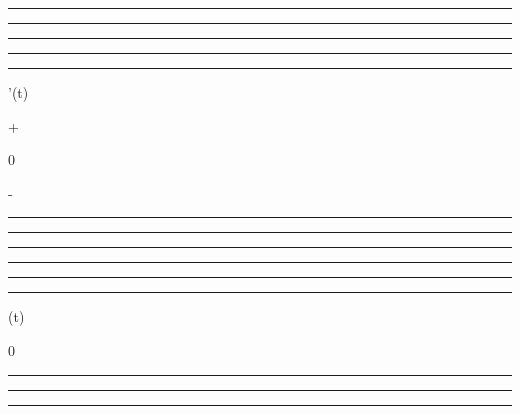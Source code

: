 \begin{center}\rule{3in}{0.4pt}\end{center}

\begin{center}\rule{3in}{0.4pt}\end{center}

\begin{center}\rule{3in}{0.4pt}\end{center}

\begin{center}\rule{3in}{0.4pt}\end{center}

\begin{center}\rule{3in}{0.4pt}\end{center}

\phi'(t)

+

0

-

\begin{center}\rule{3in}{0.4pt}\end{center}

\begin{center}\rule{3in}{0.4pt}\end{center}

\begin{center}\rule{3in}{0.4pt}\end{center}

\begin{center}\rule{3in}{0.4pt}\end{center}

\begin{center}\rule{3in}{0.4pt}\end{center}

\begin{center}\rule{3in}{0.4pt}\end{center}

\phi(t)

\searrow

0

\nearrow

\begin{center}\rule{3in}{0.4pt}\end{center}

\begin{center}\rule{3in}{0.4pt}\end{center}

\begin{center}\rule{3in}{0.4pt}\end{center}

